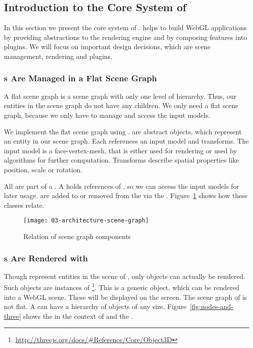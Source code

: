 \documentclass[../../ClassicThesis.tex]{subfiles}
\begin{document}
\subsection{Introduction to the Core System of {\convertify}}
\label{sec:convertify-core-features}

In this section we present the core system of {\convertify}.
{\convertify} helps to build WebGL applications by providing
abstractions to the rendering engine and by composing
features into plugins. We will focus on important design
decisions, which are scene management, rendering and
plugins.

\subsubsection{{\threedmodel}s Are Managed in a Flat Scene
  Graph}

A flat scene graph is a scene graph with only one level of
hierarchy. Thus, our entities in the scene graph do not have
any children. We only need a flat scene graph, because we
only have to manage and access the input models.

We implement the flat scene graph using .
 are abstract objects, which represent an
entity in our scene graph. Each  references an
input model and transforms. The input model is a
face-vertex-mesh, that is either used for rendering or used
by algorithms for further computation. Transforms
describe spatial properties like position, scale or
rotation.

All  are part of a . A
 holds references of , so we can
access the input models for later usage.  are
added to or removed from the  via the
. Figure~\ref{fig:scene-graph} shows how
these classes relate.

\begin{figure}[h]
  \centering
  \texttt{[image: 03-architecture-scene-graph]}
  \caption{Relation of scene graph components}
  \label{fig:scene-graph}
\end{figure}

\subsubsection{{\threedobject}s Are Rendered with
  {\threejs}}

Though  represent entities in the scene of
{\convertify}, only {\threejs} objects can actually be
rendered. Such {\threejs} objects are instances of
\footnote{\url{http://threejs.org/docs/\#Reference/Core/Object3D}}.
This is a generic object, which can be rendered into a WebGL
scene. These  will be displayed on the
screen. The scene graph of {\threejs} is not flat. A
 can have a hierarchy of objects of
any size. Figure~\ref{fig:nodes-and-three} shows the
 in the context of  and
the .
\end{document}
